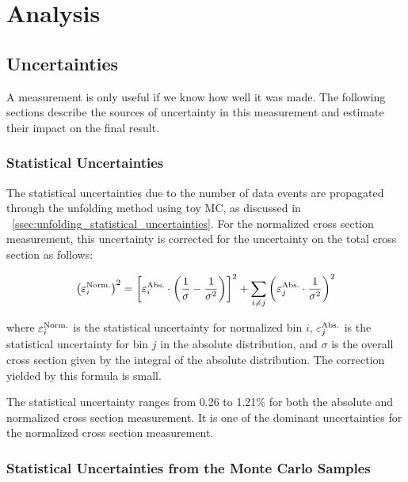 \chapter{Analysis}
\label{chapter:analysis}

\section{Uncertainties}
\label{sec:uncertainties}

A measurement is only useful if we know how well it was made. The following
sections describe the sources of uncertainty in this measurement and estimate
their impact on the final result.

\subsection{Statistical Uncertainties}
\label{ssec:stat_uncertainty}

The statistical uncertainties due to the number of data events are propagated
through the unfolding method using toy MC, as discussed in
\SEC~\ref{ssec:unfolding_statistical_uncertainties}. For the normalized cross
section measurement, this uncertainty is corrected for the uncertainty on the
total cross section as follows:

\begin{equation} \label{eq:stat}
    \left( \varepsilon^{\text{Norm.}}_{i} \right)^{2}
    =
    \left[
    \varepsilon^{\text{Abs.}}_{i} \cdot
        \left(
            \frac{1}{\sigma} - \frac{1}{\sigma^{2}}
        \right)
    \right]^{2}
    +
    \sum_{i \ne j}
    \left(
        \varepsilon^{\text{Abs.}}_{j} \cdot \frac{1}{\sigma^{2}}
    \right)^{2}
\end{equation}

where $\varepsilon^{\text{Norm.}}_{i}$ is the statistical uncertainty for normalized bin $i$,
$\varepsilon^{\text{Abs.}}_{j}$ is the statistical uncertainty for bin $j$ in the absolute
distribution, and $\sigma$ is the overall cross section given by the integral
of the absolute distribution. The correction yielded by this formula is small.

The statistical uncertainty ranges from 0.26 to 1.21\% for both the absolute
and normalized cross section measurement. It is one of the dominant
uncertainties for the normalized cross section measurement.

\subsection{Statistical Uncertainties from the Monte Carlo Samples}
\label{ssec:mc_stat_uncertainty}

